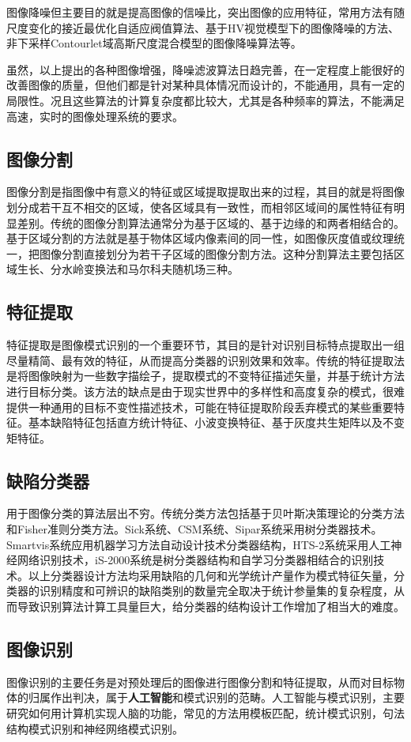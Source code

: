 {图像降噪但主要目的就是提高图像的信噪比，突出图像的应用特征，常用方法有随尺度变化的接近最优化自适应阀值算法、基于HV视觉模型下的图像降噪的方法、非下采样Contourlet域高斯尺度混合模型的图像降噪算法等。

虽然，以上提出的各种图像增强，降噪滤波算法日趋完善，在一定程度上能很好的改善图像的质量，但他们都是针对某种具体情况而设计的，不能通用，具有一定的局限性。况且这些算法的计算复杂度都比较大，尤其是各种频率的算法，不能满足高速，实时的图像处理系统的要求。
\subsection{图像分割}
图像分割是指图像中有意义的特征或区域提取提取出来的过程，其目的就是将图像划分成若干互不相交的区域，使各区域具有一致性，而相邻区域间的属性特征有明显差别。传统的图像分割算法通常分为基于区域的、基于边缘的和两者相结合的。基于区域分割的方法就是基于物体区域内像素间的同一性，如图像灰度值或纹理统一，把图像分割直接划分为若干子区域的图像分割方法。这种分割算法主要包括区域生长、分水岭变换法和马尔科夫随机场三种。
\subsection{特征提取}
特征提取是图像模式识别的一个重要环节，其目的是针对识别目标特点提取出一组尽量精简、最有效的特征，从而提高分类器的识别效果和效率。传统的特征提取法是将图像映射为一些数字描绘子，提取模式的不变特征描述矢量，并基于统计方法进行目标分类。该方法的缺点是由于现实世界中的多样性和高度复杂的模式，很难提供一种通用的目标不变性描述技术，可能在特征提取阶段丢弃模式的某些重要特征。基本缺陷特征包括直方统计特征、小波变换特征、基于灰度共生矩阵以及不变矩特征。
\subsection{缺陷分类器}
用于图像分类的算法层出不穷。传统分类方法包括基于贝叶斯决策理论的分类方法和Fisher准则分类方法。Sick系统、CSM系统、Sipar系统采用树分类器技术。Smartvis系统应用机器学习方法自动设计技术分类器结构，HTS-2系统采用人工神经网络识别技术，iS-2000系统是树分类器结构和自学习分类器相结合的识别技术。以上分类器设计方法均采用缺陷的几何和光学统计产量作为模式特征矢量，分类器的识别精度和可辨识的缺陷类别的数量完全取决于统计参量集的复杂程度，从而导致识别算法计算工具量巨大，给分类器的结构设计工作增加了相当大的难度。
\subsection{图像识别}
图像识别\citep{.2018}的主要任务是对预处理后的图像进行图像分割和特征提取，从而对目标物体的归属作出判决，属于\textbf{人工智能}和模式识别的范畴。人工智能与模式识别，主要研究如何用计算机实现人脑的功能，常见的方法用模板匹配，统计模式识别，句法结构模式识别和神经网络模式识别。

}
